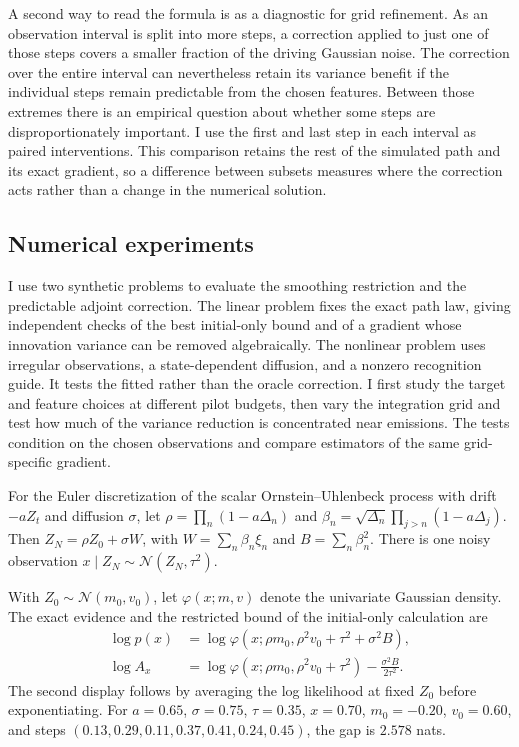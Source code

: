 \documentclass[12pt]{article}
\newcommand{\N}{\mathcal{N}}
\begin{document}
A second way to read the formula is as a diagnostic for grid refinement. As an observation interval is split into more steps, a correction applied to just one of those steps covers a smaller fraction of the driving Gaussian noise. The correction over the entire interval can nevertheless retain its variance benefit if the individual steps remain predictable from the chosen features. Between those extremes there is an empirical question about whether some steps are disproportionately important. I use the first and last step in each interval as paired interventions. This comparison retains the rest of the simulated path and its exact gradient, so a difference between subsets measures where the correction acts rather than a change in the numerical solution.
\subsection*{Numerical experiments}

I use two synthetic problems to evaluate the smoothing restriction and the predictable adjoint correction. The linear problem fixes the exact path law, giving independent checks of the best initial-only bound and of a gradient whose innovation variance can be removed algebraically. The nonlinear problem uses irregular observations, a state-dependent diffusion, and a nonzero recognition guide. It tests the fitted rather than the oracle correction. I first study the target and feature choices at different pilot budgets, then vary the integration grid and test how much of the variance reduction is concentrated near emissions. The tests condition on the chosen observations and compare estimators of the same grid-specific gradient.

For the Euler discretization of the scalar Ornstein--Uhlenbeck process with drift \(-a Z_t\) and diffusion \(\sigma\), let \(\rho=\prod_n (1-a\Delta_n)\) and \(\beta_n=\sqrt{\Delta_n}\prod_{j>n}(1-a\Delta_j)\). Then \(Z_N=\rho Z_0+\sigma W\), with \(W=\sum_n\beta_n\xi_n\) and \(B=\sum_n\beta_n^2\). There is one noisy observation \(x\mid Z_N\sim\N(Z_N,\tau^2)\).

With \(Z_0\sim\N(m_0,v_0)\), let \(\varphi(x;m,v)\) denote the univariate Gaussian density. The exact evidence and the restricted bound of the initial-only calculation are
\begin{align*}
 \log p(x)&=\log\varphi(x;\rho m_0,\rho^2v_0+\tau^2+\sigma^2 B),\\
 \log A_x&=\log\varphi(x;\rho m_0,\rho^2v_0+\tau^2)
              -\frac{\sigma^2 B}{2\tau^2}.
\end{align*}
The second display follows by averaging the log likelihood at fixed \(Z_0\) before exponentiating. For \(a=0.65\), \(\sigma=0.75\), \(\tau=0.35\), \(x=0.70\), \(m_0=-0.20\), \(v_0=0.60\), and steps \((0.13,0.29,0.11,0.37,0.41,0.24,0.45)\), the gap is \(2.578\) nats.
\end{document}
